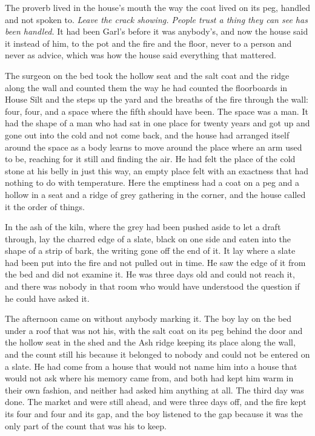 The proverb lived in the house's mouth the way the coat lived on its peg, handled and not spoken to. \emph{Leave the crack showing. People trust a thing they can see has been handled.} It had been Garl's before it was anybody's, and now the house said it instead of him, to the pot and the fire and the floor, never to a person and never as advice, which was how the house said everything that mattered.

The surgeon on the bed took the hollow seat and the salt coat and the ridge along the wall and counted them the way he had counted the floorboards in House Silt and the steps up the yard and the breaths of the fire through the wall: four, four, and a space where the fifth should have been. The space was a man. It had the shape of a man who had sat in one place for twenty years and got up and gone out into the cold and not come back, and the house had arranged itself around the space as a body learns to move around the place where an arm used to be, reaching for it still and finding the air. He had felt the place of the cold stone at his belly in just this way, an empty place felt with an exactness that had nothing to do with temperature. Here the emptiness had a coat on a peg and a hollow in a seat and a ridge of grey gathering in the corner, and the house called it the order of things.

In the ash of the kiln, where the grey had been pushed aside to let a draft through, lay the charred edge of a slate, black on one side and eaten into the shape of a strip of bark, the writing gone off the end of it. It lay where a slate had been put into the fire and not pulled out in time. He saw the edge of it from the bed and did not examine it. He was three days old and could not reach it, and there was nobody in that room who would have understood the question if he could have asked it.

The afternoon came on without anybody marking it. The boy lay on the bed under a roof that was not his, with the salt coat on its peg behind the door and the hollow seat in the shed and the Ash ridge keeping its place along the wall, and the count still his because it belonged to nobody and could not be entered on a slate. He had come from a house that would not name him into a house that would not ask where his memory came from, and both had kept him warm in their own fashion, and neither had asked him anything at all. The third day was done. The market and  were still ahead, and  were three days off, and the fire kept its four and four and its gap, and the boy listened to the gap because it was the only part of the count that was his to keep.
